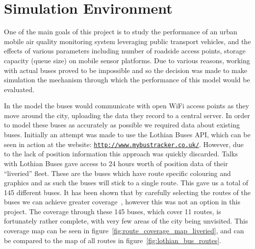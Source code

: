 \chapter{Simulation Environment}\label{simulation}
    
    One of the main goals of this project is to study the performance of an urban mobile air quality monitoring system leveraging public transport vehicles, and the effects of various parameters including number of roadside access points, storage capacity (queue size) on mobile sensor platforms. Due to various reasons, working with actual buses proved to be impossible and so the decision was made to make simulation the mechanism through which the performance of this model would be evaluated. 

    In the model the buses would communicate with open WiFi access points as they move around the city, uploading the data they record to a central server. In order to model these buses as accurately as possible we required data about existing buses. Initially an attempt was made to use the Lothian Buses API, which can be seen in action at the website: \href{http://www.mybustracker.co.uk/}{\nolinkurl{http://www.mybustracker.co.uk/}}. However, due to the lack of position information this approach was quickly discarded. Talks with Lothian Buses gave access to 24 hours worth of position data of their ``liveried'' fleet. These are the buses which have route specific colouring and graphics and as such the buses will stick to a single route. This gave us a total of 145 different buses. It has been shown that by carefully selecting the routes of the buses we can achieve greater coverage~\cite{opensenserouteselection}, however this was not an option in this project. The coverage through these 145 buses, which cover 11 routes, is fortunately rather complete, with very few areas of the city being unvisited. This coverage map can be seen in figure~\ref{fig:route_coverage_map_liveried}, and can be compared to the map of all routes in figure~\ref{fig:lothian_bus_routes}.



